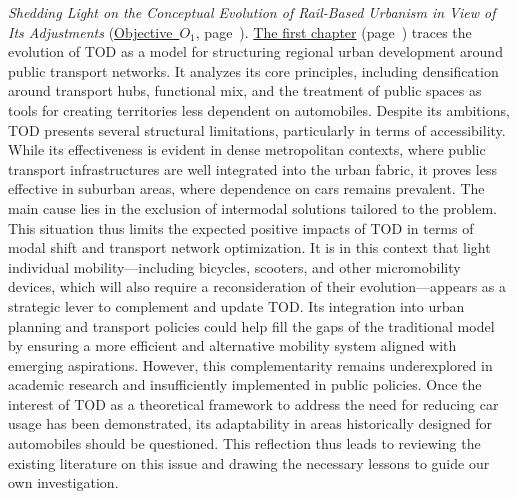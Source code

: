 \textsl{Shedding Light on the Conceptual Evolution of Rail-Based Urbanism in View of Its Adjustments} (\hyperref[objectif-1]{Objective~\(O_1\)}, page~\pageref{objectif-1}). \hyperref[chap1:titre]{The first chapter} (page~\pageref{chap1:titre}) traces the evolution of \acrshort{TOD} as a model for structuring regional urban development around public transport networks. It analyzes its core principles, including densification around transport hubs, functional mix, and the treatment of public spaces as tools for creating territories less dependent on automobiles. Despite its ambitions, \acrshort{TOD} presents several structural limitations, particularly in terms of accessibility. While its effectiveness is evident in dense metropolitan contexts, where public transport infrastructures are well integrated into the urban fabric, it proves less effective in suburban areas, where dependence on cars remains prevalent. The main cause lies in the exclusion of intermodal solutions tailored to the  problem. This situation thus limits the expected positive impacts of \acrshort{TOD} in terms of modal shift and transport network optimization. It is in this context that light individual mobility—including bicycles, scooters, and other micromobility devices, which will also require a reconsideration of their evolution—appears as a strategic lever to complement and update \acrshort{TOD}. Its integration into urban planning and transport policies could help fill the gaps of the traditional model by ensuring a more efficient and alternative mobility system aligned with emerging aspirations. However, this complementarity remains underexplored in academic research and insufficiently implemented in public policies. Once the interest of \acrshort{TOD} as a theoretical framework to address the need for reducing car usage has been demonstrated, its adaptability in areas historically designed for automobiles should be questioned. This reflection thus leads to reviewing the existing literature on this issue and drawing the necessary lessons to guide our own investigation.%

